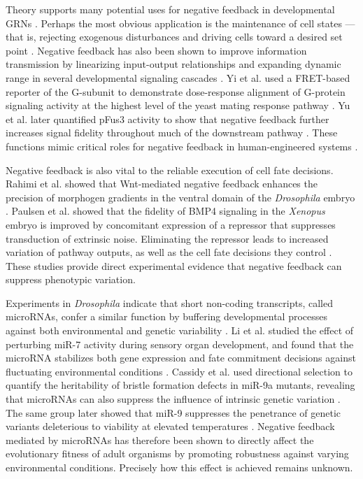 Theory supports many potential uses for negative feedback in developmental GRNs \cite{Freeman2000}. Perhaps the most obvious application is the maintenance of cell states --- that is, rejecting exogenous disturbances and driving cells toward a desired set point \cite{Alon2007,Behar2007,Yi2000}. Negative feedback has also been shown to improve information transmission by linearizing input-output relationships and expanding dynamic range in several developmental signaling cascades \cite{Bhalla2002,Cheong2011,Paulsen2011,Yi2003,Yu2008a}. Yi et al. used a FRET-based reporter of the G\textalpha-subunit to demonstrate dose-response alignment of G-protein signaling activity at the highest level of the yeast mating response pathway \cite{Yi2003}. Yu et al. later quantified pFus3 activity to show that negative feedback further increases signal fidelity throughout much of the downstream pathway \cite{Yu2008a}. These functions mimic critical roles for negative feedback in human-engineered systems \cite{Khammash2016}.

Negative feedback is also vital to the reliable execution of cell fate decisions. Rahimi et al. showed that Wnt-mediated negative feedback enhances the precision of morphogen gradients in the ventral domain of the \textit{Drosophila} embryo \cite{Rahimi2016}. Paulsen et al. showed that the fidelity of BMP4 signaling in the \textit{Xenopus} embryo is improved by concomitant expression of a repressor that suppresses transduction of extrinsic noise. Eliminating the repressor leads to increased variation of pathway outputs, as well as the cell fate decisions they control \cite{Paulsen2011}. These studies provide direct experimental evidence that negative feedback can suppress phenotypic variation. 

Experiments in \emph{Drosophila} indicate that short non-coding transcripts, called microRNAs, confer a similar function by buffering developmental processes against both environmental and genetic variability \cite{Cassidy2016a,Cassidy2013,Li2009b,Ebert2012}. Li et al. studied the effect of perturbing miR-7 activity during sensory organ development, and found that the microRNA stabilizes both gene expression and fate commitment decisions against fluctuating environmental conditions \cite{Li2009b}. Cassidy et al. used directional selection to quantify the heritability of bristle formation defects in miR-9a mutants, revealing that microRNAs can also suppress the influence of intrinsic genetic variation \cite{Cassidy2013}. The same group later showed that miR-9 suppresses the penetrance of genetic variants deleterious to viability at elevated temperatures \cite{Cassidy2016a}. Negative feedback mediated by microRNAs has therefore been shown to directly affect the evolutionary fitness of adult organisms by promoting robustness against varying environmental conditions. Precisely how this effect is achieved remains unknown.

